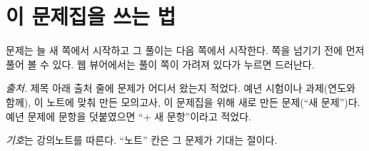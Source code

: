 \documentclass[11pt]{article}
\begin{document}
\makelecheader
\probheads

\tableofcontents

\clearpage
\markboth{}{}
\section*{이 문제집을 쓰는 법}
문제는 늘 새 쪽에서 시작하고 그 풀이는 다음 쪽에서 시작한다. 쪽을 넘기기 전에
먼저 풀어 볼 수 있다. 웹 뷰어에서는 풀이 쪽이 가려져 있다가 누르면 드러난다.

\emph{출처.} 제목 아래 출처 줄에 문제가 어디서 왔는지 적었다. 예년 시험이나
과제(연도와 함께), 이 노트에 맞춰 만든 모의고사, 이 문제집을 위해 새로 만든
문제(``새 문제'')다. 예년 문제에 문항을 덧붙였으면 ``+ 새 문항''이라고 적었다.

\emph{기호}는 강의노트를 따른다. ``노트'' 칸은 그 문제가 기대는 절이다.



\end{document}

